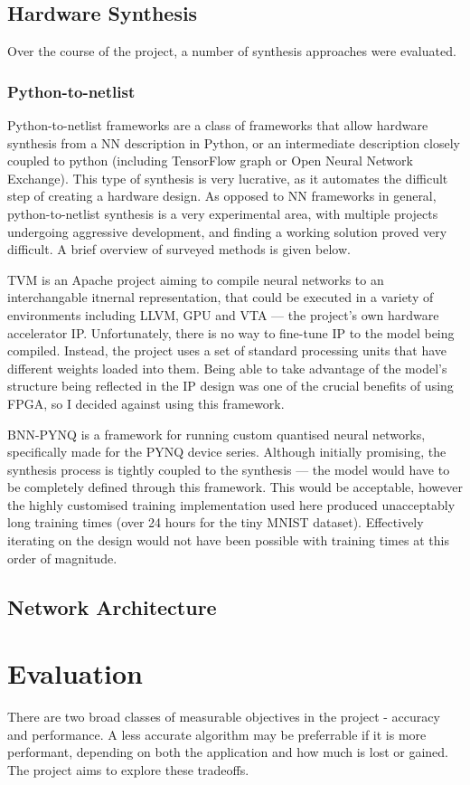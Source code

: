 \documentclass[12pt]{article}
\begin{document}
\subsection{Hardware Synthesis}
Over the course of the project, a number of synthesis approaches were evaluated.
\subsubsection{Python-to-netlist}
Python-to-netlist frameworks are a class of frameworks that allow hardware synthesis from a 
NN description in Python, or an intermediate description closely coupled to python (including
TensorFlow graph or Open Neural Network Exchange).
This type of synthesis is very lucrative, as it automates the difficult step of creating a hardware design.
As opposed to NN frameworks in general, python-to-netlist synthesis is a very experimental area,
with multiple projects undergoing aggressive development, and finding a working solution proved
very difficult. A brief overview of surveyed methods is given below.

TVM is an Apache project aiming to compile neural networks to an interchangable itnernal representation,
that could be executed in a variety of environments including LLVM, GPU and VTA --- the project's own
hardware accelerator IP. Unfortunately, there is no way to fine-tune IP to the model being compiled.
Instead, the project uses a set of standard processing units that have different weights loaded into them.
Being able to take advantage of the model's structure being reflected in the IP design was one of the crucial 
benefits of using FPGA, so I decided against using this framework.

BNN-PYNQ is a framework for running custom quantised neural networks, specifically made for the PYNQ
device series. Although initially promising, the synthesis process is tightly coupled to the synthesis ---
the model would have to be completely defined through this framework. This would be acceptable, however the 
highly customised training implementation used here produced unacceptably long training times (over 24 hours
for the tiny MNIST dataset). Effectively iterating on the design would not have been possible with training times at this order of magnitude.


\subsection{Network Architecture}
\section{Evaluation}
There are two broad classes of measurable objectives in the project - accuracy and performance.
A less accurate algorithm may be preferrable if it is more performant, depending on both
the application and how much is lost or gained. The project aims to explore these tradeoffs.
\end{document}
